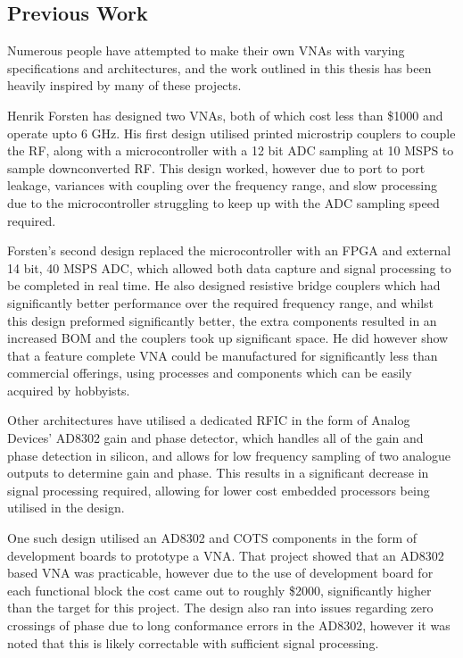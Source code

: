 \subsection{Previous Work}
Numerous people have attempted to make their own VNAs with varying specifications and architectures, and the work outlined in this thesis has been heavily inspired by many of these projects. 

Henrik Forsten has designed two VNAs, both of which cost less than \$1000 and operate upto 6 GHz. His first design \cite{henrik_1} utilised printed microstrip couplers to couple the RF, along with a microcontroller with a 12 bit ADC sampling at 10 MSPS to sample downconverted RF. This design worked, however due to port to port leakage, variances with coupling over the frequency range, and slow processing due to the microcontroller struggling to keep up with the ADC sampling speed required. 

Forsten's second design \cite{henrik_2} replaced the microcontroller with an FPGA and external 14 bit, 40 MSPS ADC, which allowed both data capture and signal processing to be completed in real time. He also designed resistive bridge couplers which had significantly better performance over the required frequency range, and whilst this design preformed significantly better, the extra components resulted in an increased BOM and the couplers took up significant space. He did however show that a feature complete VNA could be manufactured for significantly less than commercial offerings, using processes and components which can be easily acquired by hobbyists.  

Other architectures have utilised a dedicated RFIC in the form of Analog Devices' AD8302 gain and phase detector, which handles all of the gain and phase detection in silicon, and allows for low frequency sampling of two analogue outputs to determine gain and phase. This results in a significant decrease in signal processing required, allowing for lower cost embedded processors being utilised in the design. 

One such design \cite{nagy_vna} utilised an AD8302 and COTS components in the form of development boards to prototype a VNA. That project showed that an AD8302 based VNA was practicable, however due to the use of development board for each functional block the cost came out to roughly \$2000, significantly higher than the target for this project. The design also ran into issues regarding zero crossings of phase due to long conformance errors in the AD8302, however it was noted that this is likely correctable with sufficient signal processing.  

